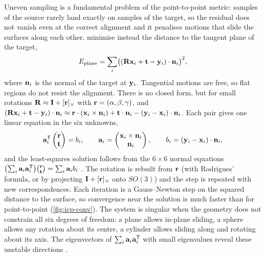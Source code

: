 Uneven sampling is a fundamental problem of the point-to-point metric: samples of the source
rarely land exactly on samples of the target, so the residual does not vanish even at the correct
alignment and it penalises motions that slide the surfaces along each other. 
minimise instead the distance to the tangent plane of the target,
\begin{equation}
E_{\text{plane}}=\sum_i\bigl((\mathbf{R}\mathbf{x}_i+\mathbf{t}-\mathbf{y}_i)\cdot\mathbf{n}_i\bigr)^2 ,
\end{equation}
where $\mathbf{n}_i$ is the normal of the target at $\mathbf{y}_i$. Tangential motions are free, so flat regions do
not resist the alignment. There is no closed form, but for small rotations
$\mathbf{R}\approx\mathbf{I}+[\mathbf{r}]_\times$ with $\mathbf{r}=(\alpha,\beta,\gamma)$, and
$(\mathbf{R}\mathbf{x}_i+\mathbf{t}-\mathbf{y}_i)\cdot\mathbf{n}_i\approx\mathbf{r}\cdot(\mathbf{x}_i\times\mathbf{n}_i)+\mathbf{t}\cdot\mathbf{n}_i-(\mathbf{y}_i-\mathbf{x}_i)\cdot\mathbf{n}_i$.
Each pair gives one linear equation in the six unknowns,
\begin{equation}
\mathbf a_i^{\mathsf{T}}\begin{pmatrix}\mathbf{r}\\\mathbf{t}\end{pmatrix}=b_i,\qquad
\mathbf a_i=\begin{pmatrix}\mathbf{x}_i\times\mathbf{n}_i\\\mathbf{n}_i\end{pmatrix},\qquad b_i=(\mathbf{y}_i-\mathbf{x}_i)\cdot\mathbf{n}_i ,
\end{equation}
and the least-squares solution follows from the $6\times6$ normal equations
$\bigl(\sum_i\mathbf a_i\mathbf a_i^{\mathsf{T}}\bigr)\binom{\mathbf{r}}{\mathbf{t}}=\sum_i\mathbf a_ib_i$ \citep{Low2004}.
The rotation is rebuilt from $\mathbf{r}$ (with Rodrigues' formula, or by projecting $\mathbf{I}+[\mathbf{r}]_\times$ onto
$SO(3)$) and the step is repeated with new correspondences. Each iteration is a Gauss--Newton
step on the squared distance to the surface, so convergence near the solution is much faster than
for point-to-point (\cref{fig:icp-conv}). The system is singular when the geometry does not
constrain all six degrees of freedom: a plane allows in-plane sliding, a sphere allows any rotation
about its centre, a cylinder allows sliding along and rotating about its axis. The eigenvectors of
$\sum_i\mathbf a_i\mathbf a_i^{\mathsf{T}}$ with small eigenvalues reveal these unstable directions
\citep{Gelfand2005}.


